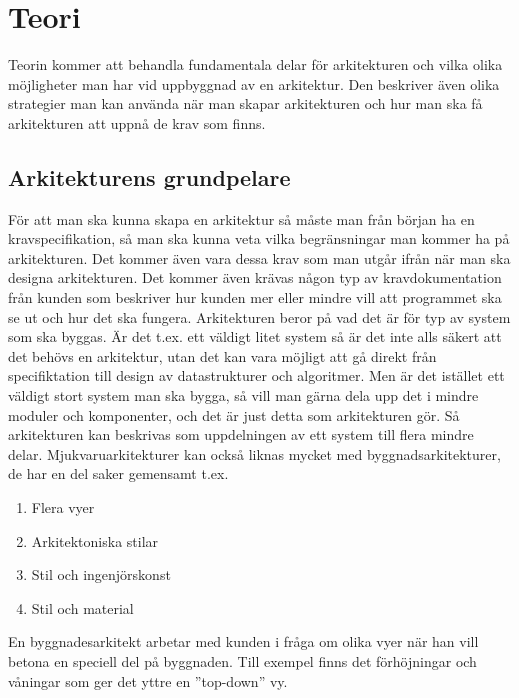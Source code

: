 \section{Teori}
Teorin kommer att behandla fundamentala delar för arkitekturen och vilka olika möjligheter man har vid uppbyggnad av en arkitektur. Den beskriver även olika strategier man kan använda när man skapar arkitekturen och hur man ska få arkitekturen att uppnå de krav som finns.

\subsection{Arkitekturens grundpelare}
För att man ska kunna skapa en arkitektur så måste man från början ha en kravspecifikation, så man ska kunna veta vilka begränsningar man kommer ha på arkitekturen. Det kommer även vara dessa krav som man utgår ifrån när man ska designa arkitekturen.
\newline
\newline
Det kommer även krävas någon typ av kravdokumentation från kunden som beskriver hur kunden mer eller mindre vill att programmet ska se ut och hur det ska fungera.
\newline
\newline
Arkitekturen beror på vad det är för typ av system som ska byggas. Är det t.ex. ett väldigt litet system så är det inte alls säkert att det behövs en arkitektur, utan det kan vara möjligt att gå direkt från specifiktation till design av datastrukturer och algoritmer. Men är det istället ett väldigt stort system man ska bygga, så vill man gärna dela upp det i mindre moduler och komponenter, och det är just detta som arkitekturen gör. Så arkitekturen kan beskrivas som uppdelningen av ett system till flera mindre delar.
\newline
\newline
Mjukvaruarkitekturer kan också liknas mycket med byggnadsarkitekturer, de har en del saker gemensamt t.ex. 
\begin{enumerate}
	\item Flera vyer
	\item Arkitektoniska stilar
	\item Stil och ingenjörskonst
	\item Stil och material
\end{enumerate}
En byggnadesarkitekt arbetar med kunden i fråga om olika vyer när han vill betona en speciell del på byggnaden. Till exempel finns det förhöjningar och våningar som ger det yttre en ''top-down'' vy. \citep{perry92}


